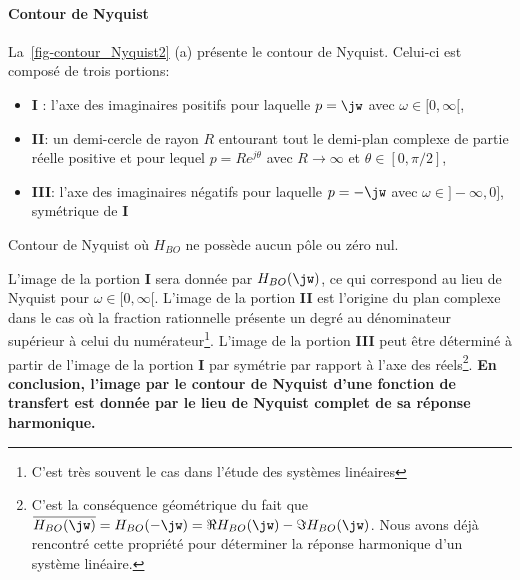 \paragraph{Contour de Nyquist}
La~\cref{fig-contour_Nyquist2} (a) présente le contour de Nyquist. Celui-ci est 
composé de trois portions:
\begin{itemize}
    \item \textbf{I} : l'axe des imaginaires positifs pour laquelle $p=\jw$ 
          avec $\omega\in[0,\infty[$,
    \item \textbf{II}: un demi-cercle de rayon $R$ entourant tout le 
          demi-plan complexe de partie réelle positive et pour lequel 
          $p=Re^{j\theta}$ avec $R\rightarrow\infty$ et $\theta\in[0,\pi/2]$,
    \item \textbf{III}: l'axe des imaginaires négatifs  pour laquelle $p=-\jw$ 
          avec $\omega\in]-\infty,0]$, symétrique de \textbf{I}
\end{itemize}
\begin{marginfigure}
    \centering
    
    \caption{Contour de Nyquist où $H_{BO}$ ne possède aucun pôle ou zéro nul.
    \label{fig-contour_Nyquist2}}
\end{marginfigure}
L'image de la portion \textbf{I} sera donnée par $H_{BO}(\jw)$, ce qui 
correspond au lieu de Nyquist pour $\omega\in[0,\infty[$. L'image de la 
portion \textbf{II} est l'origine du plan complexe dans le cas où la fraction
rationnelle présente un degré au dénominateur supérieur à celui du 
numérateur\footnote{C'est très souvent le cas dans l'étude des systèmes 
linéaires}. 
L'image de la portion \textbf{III} peut être 
déterminé à partir de l'image de la portion \textbf{I} par symétrie par 
rapport à l'axe des réels\footnote{C'est la conséquence géométrique du fait que
$\overline{H_{BO}(\jw)}=H_{BO}(-\jw)=\Re{H_{BO}(\jw)}-\Im{H_{BO}(\jw)}$. 
Nous avons déjà rencontré cette propriété pour déterminer la réponse harmonique
d'un système linéaire.}.
\textbf{En conclusion, l'image par le contour de Nyquist d'une fonction de 
transfert est donnée par le lieu de Nyquist complet de sa réponse harmonique.}
